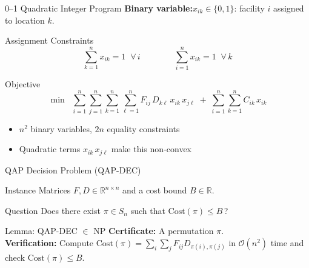 \documentclass[aspectratio=169,11pt]{beamer}
\newcommand{\Sn}{S_n}
\newcommand{\BigO}{\mathcal{O}}
\begin{document}
\begin{frame}{0--1 Quadratic Integer Program}
\textbf{Binary variable:}\quad $x_{ik}\in\{0,1\}$: facility $i$ assigned to location $k$.

\vspace{6pt}
\begin{block}{Assignment Constraints}
\[
  \sum_{k=1}^{n} x_{ik} = 1 \;\;\forall\, i
  \qquad\qquad
  \sum_{i=1}^{n} x_{ik} = 1 \;\;\forall\, k
\]
\end{block}

\begin{block}{Objective}
\[
  \min \;\;
  \sum_{i=1}^{n}\sum_{j=1}^{n}\sum_{k=1}^{n}\sum_{\ell=1}^{n}
  F_{ij}\,D_{k\ell}\,x_{ik}\,x_{j\ell}
  \;+\;
  \sum_{i=1}^{n}\sum_{k=1}^{n} C_{ik}\,x_{ik}
\]
\end{block}

\begin{itemize}
  \item $n^2$ binary variables, $2n$ equality constraints
  \item Quadratic terms $x_{ik}\,x_{j\ell}$ make this \alert{non-convex}
\end{itemize}
\end{frame}


\begin{frame}{QAP Decision Problem (QAP-DEC)}
\begin{block}{Instance}
Matrices $F,D\in\mathbb{R}^{n\times n}$ and a cost bound $B\in\mathbb{R}$.
\end{block}
\begin{block}{Question}
Does there exist $\pi\in\Sn$ such that $\mathrm{Cost}(\pi)\le B$\,?
\end{block}
\vspace{8pt}
\begin{alertblock}{Lemma: QAP-DEC $\in$ NP}
\textbf{Certificate:} A permutation $\pi$.\\
\textbf{Verification:} Compute $\mathrm{Cost}(\pi)=\sum_{i}\sum_{j}F_{ij}D_{\pi(i),\pi(j)}$ in $\BigO(n^2)$ time
and check $\mathrm{Cost}(\pi)\le B$.
\end{alertblock}
\end{frame}
\end{document}
